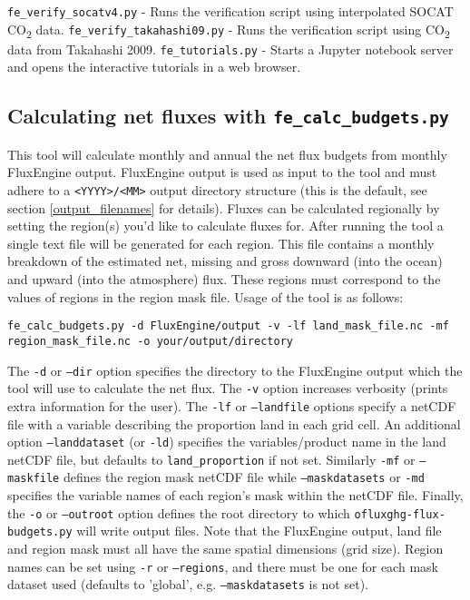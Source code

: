\documentclass[]{scrartcl}
\begin{document}
\vspace{0.25cm} \noindent
\texttt{fe\_verify\_socatv4.py} - Runs the verification script using interpolated SOCAT CO\textsubscript{2} data.
\vspace{0.25cm} \noindent
\texttt{fe\_verify\_takahashi09.py} - Runs the verification script using CO\textsubscript{2} data from Takahashi 2009.
\vspace{0.25cm} \noindent
\texttt{fe\_tutorials.py} - Starts a Jupyter notebook server and opens the interactive tutorials in a web browser.

\subsection{Calculating net fluxes with \texttt{fe\_calc\_budgets.py}}
This tool will calculate monthly and annual the net flux budgets from monthly FluxEngine output. FluxEngine output is used as input to the tool and must adhere to a \texttt{<YYYY>/<MM>} output directory structure (this is the default, see section \ref{output_filenames} for details). Fluxes can be calculated regionally by setting the region(s) you'd like to calculate fluxes for. After running the tool a single text file will be generated for each region. This file contains a monthly breakdown of the estimated net, missing and gross downward (into the ocean) and upward (into the atmosphere) flux. These regions must correspond to the values of regions in the region mask file. Usage of the tool is as follows:

\begin{lstlisting}
fe_calc_budgets.py -d FluxEngine/output -v -lf land_mask_file.nc -mf region_mask_file.nc -o your/output/directory
\end{lstlisting}

The \texttt{-d} or \texttt{--dir} option specifies the directory to the FluxEngine output which the tool will use to calculate the net flux. The \texttt{-v} option increases verbosity (prints extra information for the user). The \texttt{-lf} or \texttt{--landfile} options specify a netCDF file with a variable describing the proportion land in each grid cell. An additional option \texttt{--landdataset} (or \texttt{-ld}) specifies the variables/product name in the land netCDF file, but defaults to \texttt{land\_proportion} if not set. Similarly \texttt{-mf} or \texttt{--maskfile} defines the region mask netCDF file while \texttt{--maskdatasets} or \texttt{-md} specifies the variable names of each region's mask within the netCDF file. Finally, the \texttt{-o} or \texttt{--outroot} option defines the root directory to which \texttt{ofluxghg-flux-budgets.py} will write output files. Note that the FluxEngine output, land file and region mask must all have the same spatial dimensions (grid size). Region names can be set using \texttt{-r} or \texttt{--regions}, and there must be one for each mask dataset used (defaults to 'global', e.g. \texttt{--maskdatasets} is not set).
\end{document}
